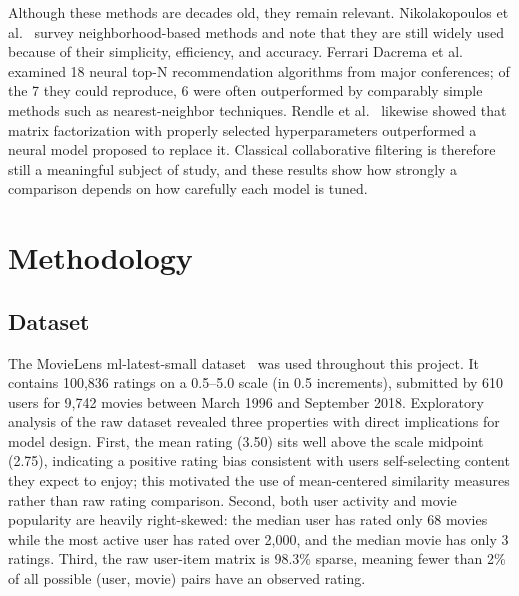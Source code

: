 \documentclass[conference]{IEEEtran}
\begin{document}
Although these methods are decades old, they remain relevant. Nikolakopoulos et al.~\cite{nikolakopoulos2022} survey neighborhood-based methods and note that they are still widely used because of their simplicity, efficiency, and accuracy. Ferrari Dacrema et al.~\cite{dacrema2019} examined 18 neural top-N recommendation algorithms from major conferences; of the 7 they could reproduce, 6 were often outperformed by comparably simple methods such as nearest-neighbor techniques. Rendle et al.~\cite{rendle2020} likewise showed that matrix factorization with properly selected hyperparameters outperformed a neural model proposed to replace it. Classical collaborative filtering is therefore still a meaningful subject of study, and these results show how strongly a comparison depends on how carefully each model is tuned.

\section{Methodology}
\label{sec:method}

\subsection{Dataset}
The MovieLens ml-latest-small dataset~\cite{harper2015} was used throughout this project. It contains 100,836 ratings on a 0.5--5.0 scale (in 0.5 increments), submitted by 610 users for 9,742 movies between March 1996 and September 2018. Exploratory analysis of the raw dataset revealed three properties with direct implications for model design. First, the mean rating (3.50) sits well above the scale midpoint (2.75), indicating a positive rating bias consistent with users self-selecting content they expect to enjoy; this motivated the use of mean-centered similarity measures rather than raw rating comparison. Second, both user activity and movie popularity are heavily right-skewed: the median user has rated only 68 movies while the most active user has rated over 2,000, and the median movie has only 3 ratings. Third, the raw user-item matrix is 98.3\% sparse, meaning fewer than 2\% of all possible (user, movie) pairs have an observed rating.
\end{document}
